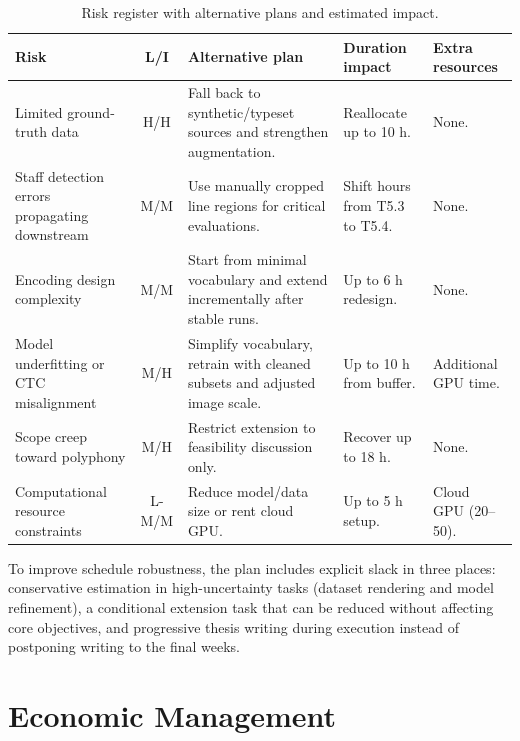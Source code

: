 \documentclass[11pt, a4paper]{article}
\begin{document}
\begin{table}[h!]
    \centering
    \caption{Risk register with alternative plans and estimated impact.}
    \label{tab:risk-register}
    \renewcommand{\arraystretch}{1.15}
    \scriptsize
    \begin{tabularx}{\linewidth}{>{\raggedright}p{2.1cm} c >{\raggedright}p{3.2cm} >{\raggedright}p{2.7cm} >{\raggedright\arraybackslash}p{2.0cm}}
        \toprule
        \textbf{Risk} & \textbf{L/I} & \textbf{Alternative plan} & \textbf{Duration impact} & \textbf{Extra resources} \\
        \midrule
        Limited ground-truth data & H/H & Fall back to synthetic/typeset sources and strengthen augmentation. & Reallocate up to 10 h. & None. \\
        Staff detection errors propagating downstream & M/M & Use manually cropped line regions for critical evaluations. & Shift hours from T5.3 to T5.4. & None. \\
        Encoding design complexity & M/M & Start from minimal vocabulary and extend incrementally after stable runs. & Up to 6 h redesign. & None. \\
        Model underfitting or CTC misalignment & M/H & Simplify vocabulary, retrain with cleaned subsets and adjusted image scale. & Up to 10 h from buffer. & Additional GPU time. \\
        Scope creep toward polyphony & M/H & Restrict extension to feasibility discussion only. & Recover up to 18 h. & None. \\
        Computational resource constraints & L-M/M & Reduce model/data size or rent cloud GPU. & Up to 5 h setup. & Cloud GPU (\EUR{}20--50). \\
        \bottomrule
    \end{tabularx}
\end{table}

To improve schedule robustness, the plan includes explicit slack in three places: conservative estimation in high-uncertainty tasks (dataset rendering and model refinement), a conditional extension task that can be reduced without affecting core objectives, and progressive thesis writing during execution instead of postponing writing to the final weeks.

\clearpage
\section{Economic Management}
\label{sec:economic-management}
\end{document}
